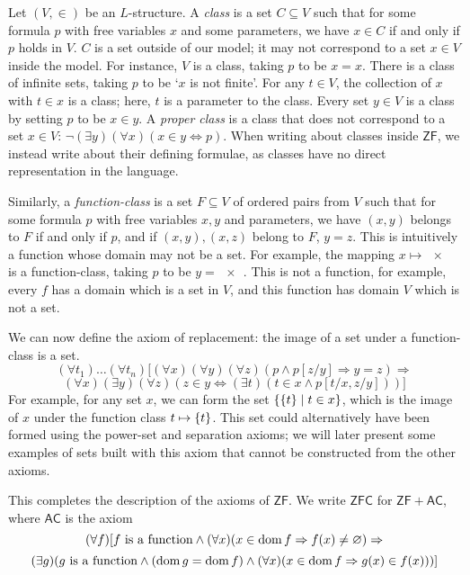 \begin{enumerate}
    Let \( (V, \in) \) be an \( L \)-structure.
    A \emph{class} is a set \( C \subseteq V \) such that for some formula \( p \) with free variables \( x \) and some parameters, we have \( x \in C \) if and only if \( p \) holds in \( V \).
    \( C \) is a set outside of our model; it may not correspond to a set \( x \in V \) inside the model.
    For instance, \( V \) is a class, taking \( p \) to be \( x = x \).
    There is a class of infinite sets, taking \( p \) to be `\( x \) is not finite'.
    For any \( t \in V \), the collection of \( x \) with \( t \in x \) is a class; here, \( t \) is a parameter to the class.
    Every set \( y \in V \) is a class by setting \( p \) to be \( x \in y \).
    A \emph{proper class} is a class that does not correspond to a set \( x \in V \): \( \neg(\exists y)(\forall x)(x \in y \Leftrightarrow p) \).
    When writing about classes inside \( \mathsf{ZF} \), we instead write about their defining formulae, as classes have no direct representation in the language.

    Similarly, a \emph{function-class} is a set \( F \subseteq V \) of ordered pairs from \( V \) such that for some formula \( p \) with free variables \( x, y \) and parameters, we have \( (x, y) \) belongs to \( F \) if and only if \( p \), and if \( (x, y), (x, z) \) belong to \( F \), \( y = z \).
    This is intuitively a function whose domain may not be a set.
    For example, the mapping \( x \mapsto \qty{x} \) is a function-class, taking \( p \) to be \( y = \qty{x} \).
    This is not a function, for example, every \( f \) has a domain which is a set in \( V \), and this function has domain \( V \) which is not a set.

    We can now define the axiom of replacement: the image of a set under a function-class is a set.
    \[ (\forall t_1)\dots(\forall t_n)[(\forall x)(\forall y)(\forall z)(p \wedge p[z/y] \Rightarrow y = z) \Rightarrow \]
    \[ (\forall x)(\exists y)(\forall z)(z \in y \Leftrightarrow (\exists t)(t \in x \wedge p[t/x,z/y]))] \]
    For example, for any set \( x \), we can form the set \( \qty{\qty{t} \mid t \in x} \), which is the image of \( x \) under the function class \( t \mapsto \qty{t} \).
    This set could alternatively have been formed using the power-set and separation axioms; we will later present some examples of sets built with this axiom that cannot be constructed from the other axioms.
\end{enumerate}
This completes the description of the axioms of \( \mathsf{ZF} \).
We write \( \mathsf{ZFC} \) for \( \mathsf{ZF} + \mathsf{AC} \), where \( \mathsf{AC} \) is the axiom
\[ (\forall f)[f\text{ is a function} \wedge (\forall x)(x \in \operatorname{dom} f \Rightarrow f(x) \neq \varnothing) \Rightarrow \]
\[ (\exists g)(g\text{ is a function} \wedge (\operatorname{dom} g = \operatorname{dom} f) \wedge (\forall x)(x \in \operatorname{dom} f \Rightarrow g(x) \in f(x)))] \]

